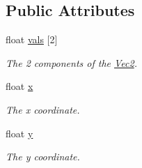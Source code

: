 \subsection*{Public Attributes}
\begin{DoxyCompactItemize}
\item 
float \hyperlink{structgfxmath_1_1_vec2_a7ea0d3fc8b8a22e4358c9dff904480ab}{vals} \mbox{[}2\mbox{]}
\begin{DoxyCompactList}\small\item\em The 2 components of the \hyperlink{structgfxmath_1_1_vec2}{Vec2}. \end{DoxyCompactList}\item 
float \hyperlink{structgfxmath_1_1_vec2_ae822579debf2a7b9aab468fbb4ce218d}{x}
\begin{DoxyCompactList}\small\item\em The x coordinate. \end{DoxyCompactList}\item 
float \hyperlink{structgfxmath_1_1_vec2_acfad5fd06cb37b0e0e5373f286e7d474}{y}
\begin{DoxyCompactList}\small\item\em The y coordinate. \end{DoxyCompactList}\end{DoxyCompactItemize}
